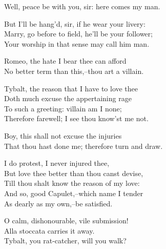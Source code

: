 \begin{speech}
Well, peace be with you, sir: here comes my man. \\

\end{speech}
\begin{speech}
But I'll be hang'd, sir, if he wear your livery: \\

Marry, go before to field, he'll be your follower; \\
Your worship in that sense may call him man. \\
\end{speech}
\begin{speech}
Romeo, the hate I bear thee can afford \\
No better term than this,--thou art a villain. \\
\end{speech}
\begin{speech}
Tybalt, the reason that I have to love thee \\
Doth much excuse the appertaining rage \\
To such a greeting: villain am I none; \\
Therefore farewell; I see thou know'st me not. \\
\end{speech}
\begin{speech}
Boy, this shall not excuse the injuries \\
That thou hast done me; therefore turn and draw. \\
\end{speech}
\begin{speech}
I do protest, I never injured thee, \\
But love thee better than thou canst devise, \\
Till thou shalt know the reason of my love: \\
And so, good Capulet,--which name I tender \\
As dearly as my own,--be satisfied. \\
\end{speech}
\begin{speech}
O calm, dishonourable, vile submission! \\
Alla stoccata carries it away.  \\
Tybalt, you rat-catcher, will you walk? \\
\end{speech}
